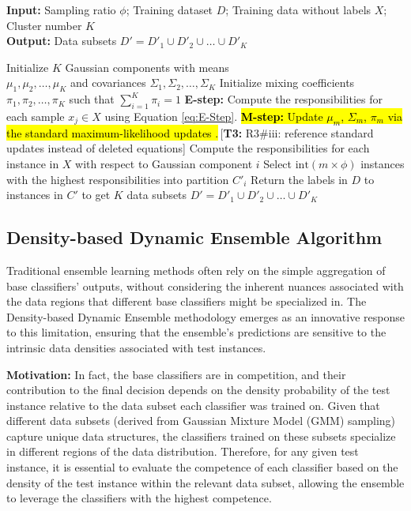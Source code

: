 \documentclass[lettersize,journal]{IEEEtran}
\newcommand{\tchange}[2]{\hl{#1}\,\textcolor{tier3note}{\footnotesize[\textbf{T3:} #2]}}
\begin{document}
	\begin{algorithm}[!t]
		\caption{GMM Sampling}
		\label{algo:gmm}
		\textbf{Input:} Sampling ratio $\phi$; Training dataset $D$; Training data without labels $X$; Cluster number $K$ \\
		\textbf{Output:} Data subsets $D' = D'_1 \cup D'_2 \cup \dots \cup D'_K$
		\begin{algorithmic}[1]
			\State Initialize $K$ Gaussian components with means \\
			$\mu_1, \mu_2, \dots, \mu_K$ and covariances $\Sigma_1, \Sigma_2, \dots, \Sigma_K$
			\State Initialize mixing coefficients $\pi_1, \pi_2, \dots, \pi_K$ such that $\sum_{i=1}^{K} \pi_i = 1$
			\Repeat
			\State \textbf{E-step:} Compute the responsibilities for each sample $x_j \in X$ using Equation \ref{eq:E-Step}.
			\State \tchange{\textbf{M-step:} Update \mbox{$\mu_m$}, \mbox{$\Sigma_m$}, \mbox{$\pi_m$} via the standard maximum-likelihood updates \mbox{\cite{dempster_maximum_1977}}.}{R3\#iii: reference standard updates instead of deleted equations}
			\State Compute the responsibilities for each instance in $X$ with respect to Gaussian component $i$
			\State Select $\text{int}(m \times \phi)$ instances with the highest responsibilities into partition $C'_i$
			\EndFor
			\State Return the labels in $D$ to instances in $C'$ to get $K$ data subsets $D' = D'_1 \cup D'_2 \cup \dots \cup D'_K$
			\EndProcedure
		\end{algorithmic}
	\end{algorithm}
	
	\subsection{Density-based Dynamic Ensemble Algorithm}
	\noindent Traditional ensemble learning methods often rely on the simple aggregation of base classifiers’ outputs, without considering the inherent nuances
	associated with the data regions that different base classifiers might be specialized in. The Density-based Dynamic Ensemble methodology emerges
	as an innovative response to this limitation, ensuring that the ensemble’s
	predictions are sensitive to the intrinsic data densities associated with test
	instances.
	
	\textbf{Motivation:} In fact, the base classifiers are in competition, and their contribution to the final decision depends on the density probability of the test instance relative to the data subset each classifier was trained on. Given that different data subsets (derived from Gaussian Mixture Model (GMM) sampling) capture unique data structures, the classifiers trained on these subsets specialize in different regions of the data distribution. Therefore, for any given test instance, it is essential to evaluate the competence of each classifier based on the density of the test instance within the relevant data subset, allowing the ensemble to leverage the classifiers with the highest competence.
	
\end{document}
